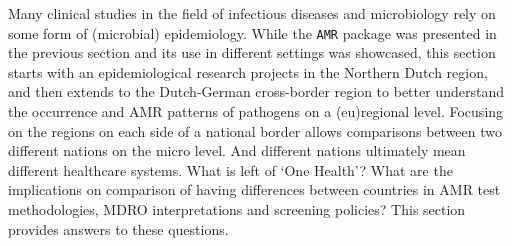 \documentclass[
]{book}
\begin{document}
Many clinical studies in the field of infectious diseases and microbiology rely on some form of (microbial) epidemiology. While the \texttt{AMR} package was presented in the previous section and its use in different settings was showcased, this section starts with an epidemiological research projects in the Northern Dutch region, and then extends to the Dutch-German cross-border region to better understand the occurrence and AMR patterns of pathogens on a (eu)regional level. Focusing on the regions on each side of a national border allows comparisons between two different nations on the micro level. And different nations ultimately mean different healthcare systems. What is left of `One Health'? What are the implications on comparison of having differences between countries in AMR test methodologies, MDRO interpretations and screening policies? This section provides answers to these questions.
\end{document}
